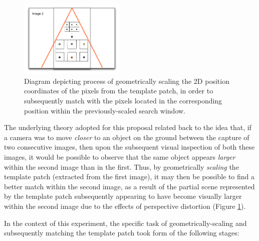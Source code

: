 \begin{figure}
  \begin{center}
    \includegraphics[width=0.45\textwidth]{images/scaling.png}
  \end{center}
  \vspace{-10pt}
  \caption{Diagram depicting process of geometrically scaling the 2D position coordinates of the pixels from the template patch, in order to subsequently match with the pixels located in the corresponding position within the previously-scaled search window.}
  \label{fig:scaled}
  \vspace{-10pt}
\end{figure}

The underlying theory adopted for this proposal related back to the idea that, if a camera was to move \textit{closer} to an object on the ground between the capture of two consecutive images, then upon the subsequent visual inspection of both these images, it would be possible to observe that the same object appears \textit{larger} within the second image than in the first. Thus, by geometrically \textit{scaling} the template patch (extracted from the first image), it may then be possible to find a better match within the second image, as a result of the partial scene represented by the template patch subsequently appearing to have become visually larger within the second image due to the effects of perspective distortion (Figure \ref{fig:scaled}).

In the context of this experiment, the specific task of geometrically-scaling and subsequently matching the template patch took form of the following stages:

